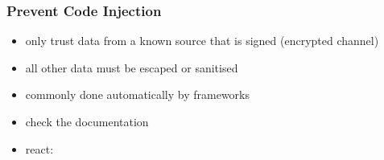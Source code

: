 \begin{frame}[fragile] \frametitle{Prevent Code Injection}
\begin{itemize}
  \item only trust data from a known source that is signed (encrypted channel)
  \item all other data must be escaped or sanitised
  \item commonly done automatically by frameworks
  \item check the documentation
  \item react:
\end{itemize}
\end{frame}
